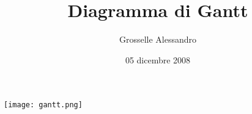 \documentclass[11pt,a4paper]{article}
\title{Diagramma di Gantt}
\author{Grosselle Alessandro}
\date{05 dicembre 2008}
\begin{document}
\maketitle
\texttt{[image: gantt.png]}
\end{document}
